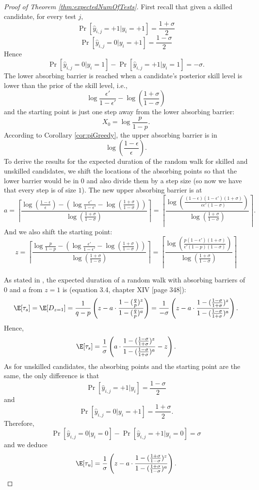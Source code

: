 \begin{proof}[Proof of Theorem \ref{thm:expectedNumOfTests}]
First recall that given a skilled candidate, for every test $j$,
\[
\Pr[\hat{y}_{i,j}=+1|y_i=+1]=\frac{1+\sigma}{2}
\]
\[
\Pr[\hat{y}_{i,j}=0|y_i=+1]=\frac{1-\sigma}{2}
\]
Hence
\[
\Pr[\hat{y}_{i,j}=0|y_i=1]-\Pr[\hat{y}_{i,j}=+1|y_i=1]=-\sigma.
\]
The lower absorbing barrier is reached 
when a candidate's posterior skill level is lower than the prior of the skill level, i.e.,
\[
\log \frac{\epsilon'}{1-\epsilon'}-\log \left(\frac{1+\sigma}{1-\sigma}\right)
\]
and the starting point is just one step away from the lower absorbing barrier: 
\[
X_0=\log \frac{p}{1-p}.
\]
According to Corollary \ref{cor:piGreedy}, the upper absorbing barrier is in
\[
\log(\frac{1-\epsilon}{\epsilon}).
\]
To derive the results for the expected duration of the random walk for skilled and unskilled candidates, we shift the locations of the absorbing points so that the lower barrier would be in 0 and also divide them by a step size (so now we have that every step is of size $1$). The new upper absorbing barrier is at 
\[
a=\left\lceil\frac{\log(\frac{1-\epsilon}{\epsilon})-
(\log \frac{\epsilon'}{1-\epsilon'}-\log(\frac{1+\sigma}{1-\sigma}))}{\log(\frac{1+\sigma}{1-\sigma})}\right\rceil=
\left\lceil\frac{\log(\frac{(1-\epsilon)(1-\epsilon')(1+\sigma)}{\epsilon \epsilon'(1-\sigma)})}{\log(\frac{1+\sigma}{1-\sigma})}\right\rceil.
\]
And we also shift the starting point:
\[
z=\left\lceil\frac{\log \frac{p}{1-p}-
(\log \frac{ \epsilon'}{1- \epsilon'}-\log(\frac{1+\sigma}{1-\sigma}))}{\log(\frac{1+\sigma}{1-\sigma})}\right\rceil=
\left\lceil\frac{\log (\frac{p(1-\epsilon')(1+\sigma)}{\epsilon'(1-p)(1-\sigma)})}{\log(\frac{1+\sigma}{1-\sigma})}\right\rceil
\]

As stated in \cite{feller1}, the expected duration of a random walk with absorbing barriers of $0$ and $a$ from $z=1$ is (equation 3.4, chapter XIV [page 348]):
\[
\E[\tau_{s}]=\E[D_{z=1}]=\frac{1}{q-p}\left(z-a\cdot\frac{1-(\frac{q}{p})^{z}}{1-(\frac{q}{p})^{a}}\right)=
\frac{1}{-\sigma}\left(z-a\cdot\frac{1-(\frac{1-\sigma}{1+\sigma})^z}{1-(\frac{1-\sigma}{1+\sigma})^{a}}\right).\]
Hence,
\[
\E[\tau_{s}]=\frac{1}{\sigma}\left(a\cdot\frac{1-(\frac{1-\sigma}{1+\sigma})^{z}}{1-(\frac{1-\sigma}{1+\sigma})^{a}}-z\right).
\]
As for unskilled candidates, the absorbing points and the starting point are the same, the only difference is that \[
\Pr[\hat{y}_{i,j}=+1|y_i]=\frac{1-\sigma}{2}
\]
and
\[
\Pr[\hat{y}_{i,j}=0|y_i=+1]=\frac{1+\sigma}{2}.
\]
Therefore,
\[
\Pr[\hat{y}_{i,j}=0|y_i=0]-\Pr[\hat{y}_{i,j}=+1|y_i=0]=\sigma 
\]
and we deduce
\[
\E[\tau_{u}]=\frac{1}{\sigma}\left(z-a\cdot\frac{1-(\frac{1+\sigma}{1-\sigma})^{z}}{1-(\frac{1+\sigma}{1-\sigma})^{a}}\right).
\]
\end{proof}


